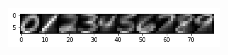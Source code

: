 \documentclass[letterpaper, 12]{article}
\begin{document}
\begin{figure}[H]
\centering
\includegraphics[width=0.5\textwidth]{eta_plot.png}
\caption{\label{}}
\end{figure}











\end{document}
